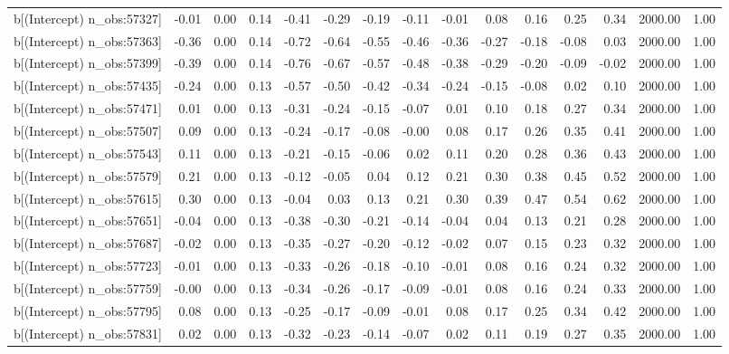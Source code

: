 \begin{table}[ht]
\begin{tabular}{rrrrrrrrrrrrrrr}
  b[(Intercept) n\_obs:57327] & -0.01 & 0.00 & 0.14 & -0.41 & -0.29 & -0.19 & -0.11 & -0.01 & 0.08 & 0.16 & 0.25 & 0.34 & 2000.00 & 1.00 \\ 
  b[(Intercept) n\_obs:57363] & -0.36 & 0.00 & 0.14 & -0.72 & -0.64 & -0.55 & -0.46 & -0.36 & -0.27 & -0.18 & -0.08 & 0.03 & 2000.00 & 1.00 \\ 
  b[(Intercept) n\_obs:57399] & -0.39 & 0.00 & 0.14 & -0.76 & -0.67 & -0.57 & -0.48 & -0.38 & -0.29 & -0.20 & -0.09 & -0.02 & 2000.00 & 1.00 \\ 
  b[(Intercept) n\_obs:57435] & -0.24 & 0.00 & 0.13 & -0.57 & -0.50 & -0.42 & -0.34 & -0.24 & -0.15 & -0.08 & 0.02 & 0.10 & 2000.00 & 1.00 \\ 
  b[(Intercept) n\_obs:57471] & 0.01 & 0.00 & 0.13 & -0.31 & -0.24 & -0.15 & -0.07 & 0.01 & 0.10 & 0.18 & 0.27 & 0.34 & 2000.00 & 1.00 \\ 
  b[(Intercept) n\_obs:57507] & 0.09 & 0.00 & 0.13 & -0.24 & -0.17 & -0.08 & -0.00 & 0.08 & 0.17 & 0.26 & 0.35 & 0.41 & 2000.00 & 1.00 \\ 
  b[(Intercept) n\_obs:57543] & 0.11 & 0.00 & 0.13 & -0.21 & -0.15 & -0.06 & 0.02 & 0.11 & 0.20 & 0.28 & 0.36 & 0.43 & 2000.00 & 1.00 \\ 
  b[(Intercept) n\_obs:57579] & 0.21 & 0.00 & 0.13 & -0.12 & -0.05 & 0.04 & 0.12 & 0.21 & 0.30 & 0.38 & 0.45 & 0.52 & 2000.00 & 1.00 \\ 
  b[(Intercept) n\_obs:57615] & 0.30 & 0.00 & 0.13 & -0.04 & 0.03 & 0.13 & 0.21 & 0.30 & 0.39 & 0.47 & 0.54 & 0.62 & 2000.00 & 1.00 \\ 
  b[(Intercept) n\_obs:57651] & -0.04 & 0.00 & 0.13 & -0.38 & -0.30 & -0.21 & -0.14 & -0.04 & 0.04 & 0.13 & 0.21 & 0.28 & 2000.00 & 1.00 \\ 
  b[(Intercept) n\_obs:57687] & -0.02 & 0.00 & 0.13 & -0.35 & -0.27 & -0.20 & -0.12 & -0.02 & 0.07 & 0.15 & 0.23 & 0.32 & 2000.00 & 1.00 \\ 
  b[(Intercept) n\_obs:57723] & -0.01 & 0.00 & 0.13 & -0.33 & -0.26 & -0.18 & -0.10 & -0.01 & 0.08 & 0.16 & 0.24 & 0.32 & 2000.00 & 1.00 \\ 
  b[(Intercept) n\_obs:57759] & -0.00 & 0.00 & 0.13 & -0.34 & -0.26 & -0.17 & -0.09 & -0.01 & 0.08 & 0.16 & 0.24 & 0.33 & 2000.00 & 1.00 \\ 
  b[(Intercept) n\_obs:57795] & 0.08 & 0.00 & 0.13 & -0.25 & -0.17 & -0.09 & -0.01 & 0.08 & 0.17 & 0.25 & 0.34 & 0.42 & 2000.00 & 1.00 \\ 
  b[(Intercept) n\_obs:57831] & 0.02 & 0.00 & 0.13 & -0.32 & -0.23 & -0.14 & -0.07 & 0.02 & 0.11 & 0.19 & 0.27 & 0.35 & 2000.00 & 1.00 \\ 

\end{tabular}
\end{table}
